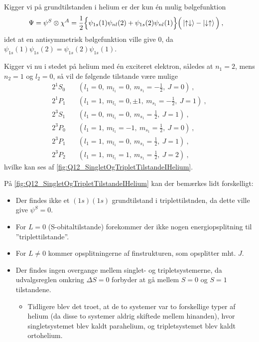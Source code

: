 Kigger vi på grundtilstanden i helium er der kun én mulig bølgefunktion
\begin{align}
    \Psi &= \psi^S \otimes \chi^A = \frac{1}{2} \Big\{\psi_{1s}(1)\psi_{nl}(2) + \psi_{1s}(2)\psi_{nl}(1)\Big\}\Big(\ket{\uparrow\downarrow} - \ket{\downarrow\uparrow}\Big) \: ,
\end{align}
idet at en antisymmetrisk bølgefunktion ville give $0$, da $\psi_{1s}(1)\psi_{1s}(2) =\psi_{1s}(2)\psi_{1s}(1)$.

Kigger vi nu i stedet på helium med én exciteret elektron, således at $n_1 = 2$, mens $n_2 = 1$ og $l_2 = 0$, så vil de følgende tilstande være mulige
\begin{align}
    2^1S_0 &\quad \left(l_1 = 0,\: m_{l_1} = 0, \: m_{s_1} = -\frac{1}{2}, \: J = 0\right) \: , \\
    2^1P_1 &\quad \left(l_1 = 1,\: m_{l_1} = 0,\pm1, \: m_{s_1} = -\frac{1}{2}, \: J = 1\right) \: , \\
    2^3S_1 &\quad \left(l_1 = 0,\: m_{l_1} = 0, \: m_{s_1} = \frac{1}{2}, \: J = 1\right) \: , \\
    2^3P_0 &\quad \left(l_1 = 1,\: m_{l_1} = -1, \: m_{s_1} = \frac{1}{2}, \: J = 0\right) \: , \\
    2^3P_1 &\quad \left(l_1 = 1,\: m_{l_1} = 0, \: m_{s_1} = \frac{1}{2}, \: J = 1\right) \: , \\
    2^3P_2 &\quad \left(l_1 = 1,\: m_{l_1} = 1, \: m_{s_1} = \frac{1}{2}, \: J = 2\right) \: ,
\end{align}
hvilke kan ses af \cref{fig:Q12_SingletOgTripletTilstandeIHelium}.

På \cref{fig:Q12_SingletOgTripletTilstandeIHelium} kan der bemærkes lidt forskelligt:
\begin{itemize}
    \item Der findes ikke et $(1s)(1s)$ grundtilstand i triplettilstnden, da dette ville give $\psi^S = 0$.
    \item For $L = 0$ (S-obitaltilstande) forekommer der ikke nogen energiopsplitning til ''triplettilstande''.
    \item For $L \ne 0$ kommer opsplitningerne af finstrukturen, som opsplitter mht. $J$.
    \item Der findes ingen overgange mellem singlet- og tripletsystemerne, da udvalgsreglen omkring $\Delta S = 0$ forbyder at gå mellem $S = 0$ og $S = 1$ tilstandene.
    \begin{itemize}
        \item Tidligere blev det troet, at de to systemer var to forskellige typer af helium (da disse to systemer aldrig skiftede mellem hinanden), hvor singletsystemet blev kaldt \textsf{parahelium}, og tripletsystemet blev kaldt \textsf{ortohelium}.
    \end{itemize}
\end{itemize}